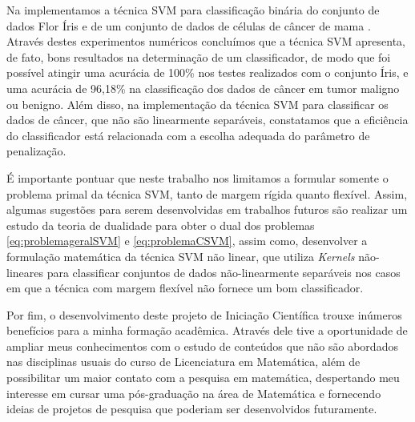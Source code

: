 \documentclass[12pt,a4paper]{scrartcl}
\theoremstyle{definition}%
\begin{document}
Na  implementamos a técnica SVM para classificação binária do conjunto de dados Flor Íris e de um conjunto de dados de células de câncer de mama \cite{Dua:2019}. Através destes experimentos numéricos concluímos que a técnica SVM apresenta, de fato, bons resultados na determinação de um classificador, de modo que foi possível atingir uma acurácia de 100\% nos testes realizados com o conjunto Íris, e uma acurácia de 96,18\% na classificação dos dados de câncer em tumor maligno ou benigno. Além disso, na implementação da técnica SVM para classificar os dados de câncer, que não são linearmente separáveis, constatamos que a eficiência do classificador está relacionada com a escolha adequada do parâmetro de penalização.

É importante pontuar que neste trabalho nos limitamos a formular somente o problema primal da técnica SVM, tanto de margem rígida quanto flexível. Assim, algumas sugestões para serem desenvolvidas em trabalhos futuros são realizar um estudo da teoria de dualidade para obter o dual dos problemas \eqref{eq:problemageralSVM} e \eqref{eq:problemaCSVM}, assim como, desenvolver a formulação matemática da técnica SVM não linear, que utiliza \emph{Kernels} não-lineares para classificar conjuntos de dados não-linearmente separáveis nos casos em que a técnica com margem flexível não fornece um bom classificador.

Por fim, o desenvolvimento deste projeto de Iniciação Científica trouxe inúmeros benefícios para a minha formação acadêmica. Através dele tive a oportunidade de ampliar meus conhecimentos com o estudo de conteúdos que não são abordados nas disciplinas usuais do curso de Licenciatura em Matemática, além de possibilitar um maior contato com a pesquisa em matemática, despertando meu interesse em cursar uma pós-graduação na área de Matemática e fornecendo ideias de projetos de pesquisa que poderiam ser desenvolvidos futuramente. 
\newpage

\printbibliography
\end{document}
